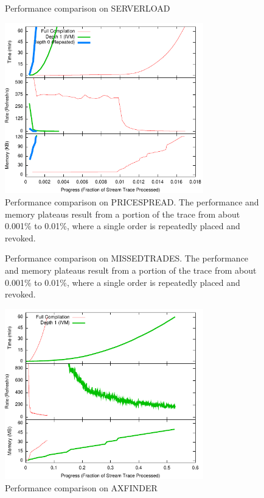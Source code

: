 \begin{figure}
\begin{center}
\caption{Performance comparison on SERVERLOAD}
\label{fig:experiments:serverload}
\end{center}
\end{figure}

\begin{figure}
\begin{center}
\includegraphics[width=3.4in]{../graphs/graphs/unified_pricespread.pdf}
\caption{Performance comparison on PRICESPREAD.  The performance and memory plateaus result from a portion of the trace from about 0.001\% to 0.01\%, where a single order is repeatedly placed and revoked.}
\label{fig:experiments:pricespread}
\end{center}
\end{figure}

\begin{figure}
\begin{center}
\caption{Performance comparison on MISSEDTRADES.  The performance and memory plateaus result from a portion of the trace from about 0.001\% to 0.01\%, where a single order is repeatedly placed and revoked.}
\label{fig:experiments:missedtrades}
\end{center}
\end{figure}


\begin{figure}
\begin{center}
\includegraphics[width=3.4in]{../graphs/graphs/unified_axfinder.pdf}
\caption{Performance comparison on AXFINDER}
\label{fig:experiments:axfinder}
\end{center}
\end{figure}

